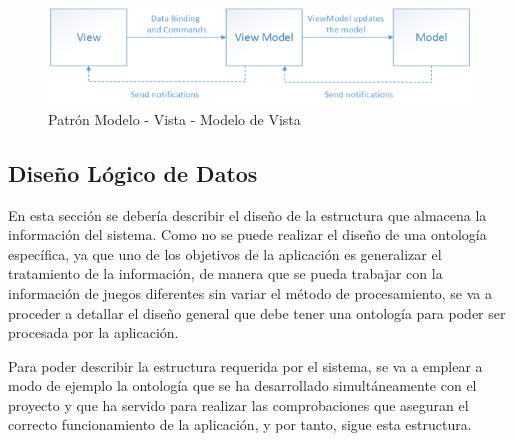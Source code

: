 \bigskip
\begin{figure}[htp]
    \centering
    \label{mvvm}
    \includegraphics[width=13cm]{Figures/mvvm.png}
    \caption{Patrón Modelo - Vista - Modelo de Vista}
\end{figure}

\subsection{Diseño Lógico de Datos}
En esta sección se debería describir el diseño de la estructura que almacena la información del sistema.
Como no se puede realizar el diseño de una ontología específica, ya que uno de los objetivos de la aplicación 
es generalizar el tratamiento de la información, de manera que se pueda trabajar con la información de juegos 
diferentes sin variar el método de procesamiento, se va a proceder a detallar el diseño general que debe 
tener una ontología para poder ser procesada por la aplicación. \medskip

Para poder describir la estructura requerida por el sistema, se va a emplear a modo de ejemplo la ontología 
que se ha desarrollado simultáneamente con el proyecto y que ha servido para realizar las comprobaciones que aseguran
el correcto funcionamiento de la aplicación, y por tanto, sigue esta estructura. \medskip




